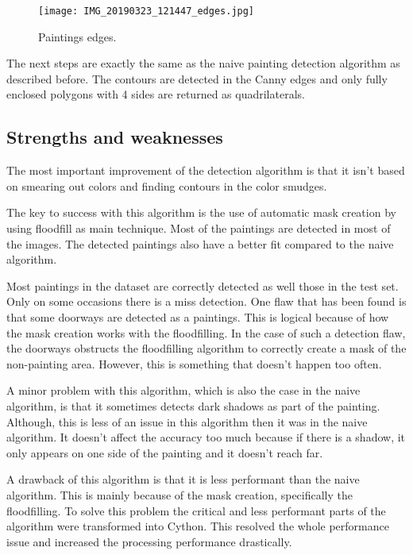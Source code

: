 \begin{figure}[h]
    \texttt{[image: IMG\_20190323\_121447\_edges.jpg]}
    \centering
    \caption{Paintings edges.}
    \label{fig:paiting_detection_paintings-edges}
\end{figure}

The next steps are exactly the same as the naive painting detection algorithm as described before. The contours are detected in the Canny edges and only fully enclosed polygons with 4 sides are returned as quadrilaterals.

\subsection{Strengths and weaknesses}

The most important improvement of the detection algorithm is that it isn't based on smearing out colors and finding contours in the color smudges.

The key to success with this algorithm is the use of automatic mask creation by using floodfill as main technique. Most of the paintings are detected in most of the images. The detected paintings also have a better fit compared to the naive algorithm.

Most paintings in the dataset are correctly detected as well those in the test set. Only on some occasions there is a miss detection. One flaw that has been found is that some doorways are detected as a paintings. This is logical because of how the mask creation works with the floodfilling. In the case of such a detection flaw, the doorways obstructs the floodfilling algorithm to correctly create a mask of the non-painting area. However, this is something that doesn't happen too often.

A minor problem with this algorithm, which is also the case in the naive algorithm, is that it sometimes detects dark shadows as part of the painting. Although, this is less of an issue in this algorithm then it was in the naive algorithm. It doesn't affect the accuracy too much because if there is a shadow, it only appears on one side of the painting and it doesn't reach far.

A drawback of this algorithm is that it is less performant than the naive algorithm. This is mainly because of the mask creation, specifically the floodfilling. To solve this problem the critical and less performant parts of the algorithm were transformed into Cython. This resolved the whole performance issue and increased the processing performance drastically.

